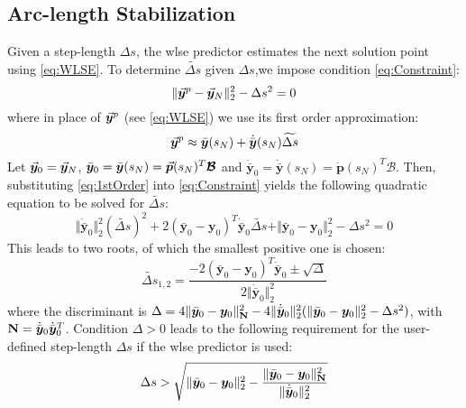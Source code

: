 \subsection{Arc-length Stabilization}\label{CH5-S2SS3}

Given a step-length $\Delta s$, the \acrshort{wlse} predictor estimates the 
next solution point using \ref{eq:WLSE}. To determine $\widetilde{\Delta s}$ 
given $\Delta s$,we impose condition
\ref{eq:Constraint}:
\begin{equation}
	\Vert \vec{\bm{y}}^p-\vec{\bm{y}}_N\Vert_2^2-\Delta s^2 = 0
	\label{eq:Constraint}
\end{equation}
where in place of $\vec{\bm{y}}^p$ (see \ref{eq:WLSE}) we use its first order 
approximation:
\begin{equation}
	\vec{\bm{y}}^p\approx 
	\bar{\bm{y}}(s_N)+\dot{\bar{\bm{y}}}(s_N)\widetilde{\Delta s}
	\label{eq:1stOrder}
\end{equation}
Let $\vec{\bm{y}}_0=\vec{\bm{y}}_N$, $\bar{\bm{y}}_0 = \bar{\bm{y}}(s_N) =
\vec{\bm{p}}(s_N)^T\bm{\mathcal{B}}$ and $\dot{\bar{\bm{y}}}_0 = 
\dot{\bar{\bm{y}}}(s_N) = \dot{\bm{p}}(s_N)^T\bm{\mathcal{B}}$. Then,
substituting \ref{eq:1stOrder} into \ref{eq:Constraint} yields the following
quadratic equation to be solved for $\widetilde{\Delta s}$:
\begin{equation}
	\Vert\dot{\bar{\bm{y}}}_0\Vert_2^2(\widetilde{\Delta s})^2+
	2(\bar{\bm{y}}_0-\bm{y}_0)^T\dot{\bar{\bm{y}}}_0 \widetilde{\Delta s}+
	\Vert \bar{\bm{y}}_0-\bm{y}_0\Vert_2^2-\Delta s^2=0
	\label{eq:QUADRATIC_STAB}
\end{equation}
This leads to two roots, of which the smallest positive one is chosen:
\begin{equation}
	\widetilde{\Delta s}_{1,2} =
	\dfrac{-2(\bar{\bm{y}}_0-\bm{y}_0)^T\dot{\bar{\bm{y}}}_0\pm\sqrt{\Delta}}
	{2\Vert\dot{\bar{\bm{y}}}_0\Vert_2^2}
	\label{eq:ROOTS}
\end{equation}
where the discriminant is $\Delta = 4\Vert
\bar{\bm{y}}_0-\bm{y}_0\Vert^2_{\mathbf{N}} -
4\Vert\dot{\bar{\bm{y}}}_0\Vert_2^2(\Vert
\bar{\bm{y}}_0-\bm{y}_0\Vert_2^2-\Delta s^2)$, with $\mathbf{N} = 
\dot{\bar{\bm{y}}}_0\dot{\bar{\bm{y}}}_0^T$. Condition $\Delta > 0$ leads to
the following requirement for the user-defined step-length $\Delta s$ if the
\acrshort{wlse} predictor is used:
\begin{equation}
	\Delta s > \sqrt{\Vert \bar{\bm{y}}_0-\bm{y}_0\Vert_2^2-
		\dfrac{\Vert 
		\bar{\bm{y}}_0-\bm{y}_0\Vert^2_{\mathbf{N}}}{\Vert\dot{\bar{\bm{y}}}_0
			\Vert_2^2}}
	\label{eq:DSREQ}
\end{equation}

